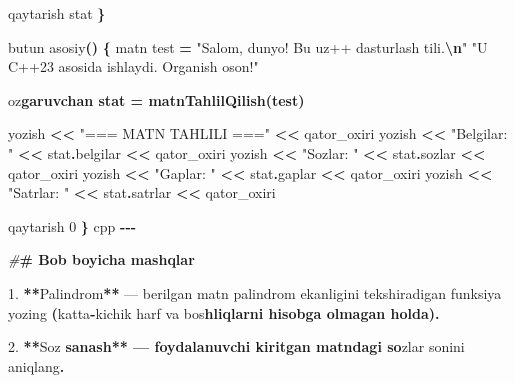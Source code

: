 \documentclass[a4paper,11pt,twoside,openright]{book}
\newenvironment{Shaded}{\begin{snugshade}}{\end{snugshade}}
\newcommand{\CharTok}[1]{\textcolor[rgb]{0.31,0.60,0.02}{#1}}
\newcommand{\DecValTok}[1]{\textcolor[rgb]{0.00,0.00,0.81}{#1}}
\newcommand{\ErrorTok}[1]{\textcolor[rgb]{0.64,0.00,0.00}{\textbf{#1}}}
\newcommand{\FloatTok}[1]{\textcolor[rgb]{0.00,0.00,0.81}{#1}}
\newcommand{\NormalTok}[1]{#1}
\newcommand{\OperatorTok}[1]{\textcolor[rgb]{0.81,0.36,0.00}{\textbf{#1}}}
\newcommand{\PreprocessorTok}[1]{\textcolor[rgb]{0.56,0.35,0.01}{\textit{#1}}}
\newcommand{\SpecialCharTok}[1]{\textcolor[rgb]{0.81,0.36,0.00}{\textbf{#1}}}
\newcommand{\StringTok}[1]{\textcolor[rgb]{0.31,0.60,0.02}{#1}}
\begin{document}
\begin{Shaded}
\begin{Highlighting}[]
\NormalTok{    qaytarish stat}
\OperatorTok{\}}

\NormalTok{butun asosiy}\OperatorTok{()} \OperatorTok{\{}
\NormalTok{    matn test }\OperatorTok{=} \StringTok{"Salom, dunyo! Bu uz++ dasturlash tili.}\SpecialCharTok{\textbackslash{}n}\StringTok{"}
                \StringTok{"U C++23 asosida ishlaydi. O\textquotesingle{}rganish oson!"}

\NormalTok{    o}\CharTok{\textquotesingle{}z}\ErrorTok{garuvchan stat = matnTahlilQilish(test)}

\NormalTok{    yozish }\OperatorTok{\textless{}\textless{}} \StringTok{"=== MATN TAHLILI ==="} \OperatorTok{\textless{}\textless{}}\NormalTok{ qator\_oxiri}
\NormalTok{    yozish }\OperatorTok{\textless{}\textless{}} \StringTok{"Belgilar: "} \OperatorTok{\textless{}\textless{}}\NormalTok{ stat}\OperatorTok{.}\NormalTok{belgilar }\OperatorTok{\textless{}\textless{}}\NormalTok{ qator\_oxiri}
\NormalTok{    yozish }\OperatorTok{\textless{}\textless{}} \StringTok{"So\textquotesingle{}zlar: "} \OperatorTok{\textless{}\textless{}}\NormalTok{ stat}\OperatorTok{.}\NormalTok{sozlar }\OperatorTok{\textless{}\textless{}}\NormalTok{ qator\_oxiri}
\NormalTok{    yozish }\OperatorTok{\textless{}\textless{}} \StringTok{"Gaplar: "} \OperatorTok{\textless{}\textless{}}\NormalTok{ stat}\OperatorTok{.}\NormalTok{gaplar }\OperatorTok{\textless{}\textless{}}\NormalTok{ qator\_oxiri}
\NormalTok{    yozish }\OperatorTok{\textless{}\textless{}} \StringTok{"Satrlar: "} \OperatorTok{\textless{}\textless{}}\NormalTok{ stat}\OperatorTok{.}\NormalTok{satrlar }\OperatorTok{\textless{}\textless{}}\NormalTok{ qator\_oxiri}

\NormalTok{    qaytarish }\DecValTok{0}
\OperatorTok{\}}
\ErrorTok{\textasciigrave{}\textasciigrave{}\textasciigrave{}}\NormalTok{cpp}
\OperatorTok{{-}{-}{-}}

\PreprocessorTok{\#}\ErrorTok{\# Bob bo\textquotesingle{}yicha mashqlar}

\FloatTok{1.} \OperatorTok{**}\NormalTok{Palindrom}\OperatorTok{**}\NormalTok{ — berilgan matn palindrom ekanligini tekshiradigan funksiya yozing }\OperatorTok{(}\NormalTok{katta}\OperatorTok{{-}}\NormalTok{kichik harf va bo}\CharTok{\textquotesingle{}s}\ErrorTok{hliqlarni hisobga olmagan holda).}

\FloatTok{2.} \OperatorTok{**}\NormalTok{So}\CharTok{\textquotesingle{}z}\ErrorTok{ sanash** — foydalanuvchi kiritgan matndagi so}\CharTok{\textquotesingle{}}\NormalTok{zlar sonini aniqlang}\OperatorTok{.}


\end{Highlighting}
\end{Shaded}
\end{document}
